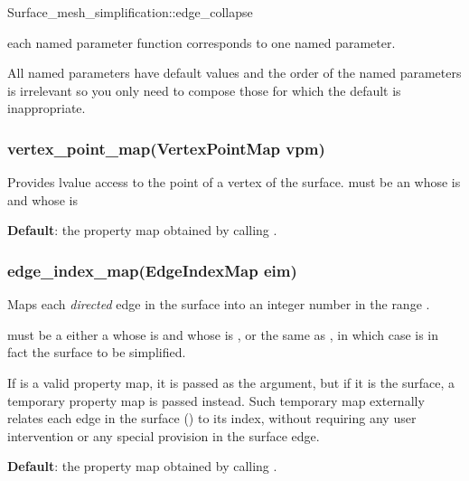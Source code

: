 \begin{ccRefFunction}{Surface_mesh_simplification::edge_collapse}

each named parameter function corresponds to one named parameter.

All named parameters have default values and the order of the named parameters 
is irrelevant so you only need to compose those for which the default
is inappropriate.

\subsubsection*{vertex\_point\_map(VertexPointMap vpm)}

Provides lvalue access to the point of a vertex of the surface.
 must be an 
whose  is
and whose  is 

\textbf{Default}: the property map obtained by calling .



\subsubsection*{edge\_index\_map(EdgeIndexMap eim)} 

Maps each {\em directed} edge in the surface into an integer number
in the range \ccc{[0,num_edges(surface))}.

 must be a either a
whose  is
and whose  is 
,
or the same as , in which case 
 is in fact the surface to be simplified.

If  is a valid property map, it is
passed as the argument, but if it is the surface, a
temporary property map is passed instead.
Such temporary map externally relates each edge 
in the surface () to its index,
without requiring any user intervention or any special
provision in the surface edge.

\textbf{Default}: the property map obtained by calling .


\end{ccRefFunction}
